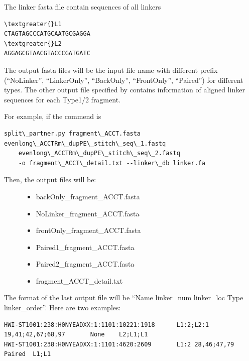 \documentclass[letterpaper,10pt,english]{sphinxmanual}
\begin{document}
The linker fasta file contain sequences of all linkers

\begin{Verbatim}[commandchars=\\\{\}]
\textgreater{}L1
CTAGTAGCCCATGCAATGCGAGGA
\textgreater{}L2
AGGAGCGTAACGTACCCGATGATC
\end{Verbatim}

The output fasta files will be the input file name with different prefix (``NoLinker'', ``LinkerOnly'', ``BackOnly'', ``FrontOnly'', ``Paired'') for different types. The other output file specified by  contains information of aligned linker sequences for each Type1/2 fragment.

For example, if the commend is

\begin{Verbatim}[commandchars=\\\{\}]
split\_partner.py fragment\_ACCT.fasta evenlong\_ACCTRm\_dupPE\_stitch\_seq\_1.fastq
    evenlong\_ACCTRm\_dupPE\_stitch\_seq\_2.fastq
    -o fragment\_ACCT\_detail.txt --linker\_db linker.fa
\end{Verbatim}
\begin{description}
\item[{Then, the output files will be:}] \leavevmode\begin{itemize}
\item {} 
backOnly\_fragment\_ACCT.fasta

\item {} 
NoLinker\_fragment\_ACCT.fasta

\item {} 
frontOnly\_fragment\_ACCT.fasta

\item {} 
Paired1\_fragment\_ACCT.fasta

\item {} 
Paired2\_fragment\_ACCT.fasta

\item {} 
fragment\_ACCT\_detail.txt

\end{itemize}

\end{description}

The format of the last output file  will be ``Name \textbar{} linker\_num \textbar{} linker\_loc \textbar{} Type \textbar{} linker\_order''. Here are two examples:

\begin{Verbatim}[commandchars=\\\{\}]
HWI-ST1001:238:H0NYEADXX:1:1101:10221:1918      L1:2;L2:1  19,41;42,67;68,97       None    L2;L1;L1
HWI-ST1001:238:H0NYEADXX:1:1101:4620:2609       L1:2 28,46;47,79     Paired  L1;L1
\end{Verbatim}
\end{document}
